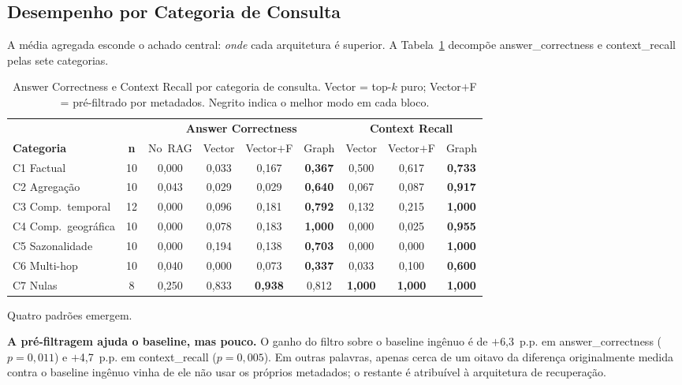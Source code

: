 \documentclass[conference]{IEEEtran}
\begin{document}
\subsection{Desempenho por Categoria de Consulta}

A média agregada esconde o achado central: \emph{onde} cada arquitetura
é superior. A Tabela~\ref{tab:por_categoria} decompõe answer\_correctness
e context\_recall pelas sete categorias.

\begin{table}[htbp]
\caption{Answer Correctness e Context Recall por categoria de consulta.
  Vector = top-$k$ puro; Vector$+$F = pré-filtrado por metadados.
  Negrito indica o melhor modo em cada bloco.}
\label{tab:por_categoria}
\begin{center}
\footnotesize
\begin{tabular}{lc|cccc|ccc}
\toprule
 & & \multicolumn{4}{c|}{\textbf{Answer Correctness}} &
     \multicolumn{3}{c}{\textbf{Context Recall}} \\
\cmidrule(lr){3-6}\cmidrule(lr){7-9}
\textbf{Categoria} & \textbf{n} & No~RAG & Vector & Vector$+$F & Graph &
  Vector & Vector$+$F & Graph \\
\midrule
C1 Factual & 10 & 0,000 & 0,033 & 0,167 & \textbf{0,367} & 0,500 & 0,617 & \textbf{0,733} \\
C2 Agregação & 10 & 0,043 & 0,029 & 0,029 & \textbf{0,640} & 0,067 & 0,087 & \textbf{0,917} \\
C3 Comp.\ temporal & 12 & 0,000 & 0,096 & 0,181 & \textbf{0,792} & 0,132 & 0,215 & \textbf{1,000} \\
C4 Comp.\ geográfica & 10 & 0,000 & 0,078 & 0,183 & \textbf{1,000} & 0,000 & 0,025 & \textbf{0,955} \\
C5 Sazonalidade & 10 & 0,000 & 0,194 & 0,138 & \textbf{0,703} & 0,000 & 0,000 & \textbf{1,000} \\
C6 Multi-hop & 10 & 0,040 & 0,000 & 0,073 & \textbf{0,337} & 0,033 & 0,100 & \textbf{0,600} \\
C7 Nulas & 8 & 0,250 & 0,833 & \textbf{0,938} & 0,812 & \textbf{1,000} & \textbf{1,000} & \textbf{1,000} \\
\bottomrule
\end{tabular}
\end{center}
\end{table}

Quatro padrões emergem.

\textbf{A pré-filtragem ajuda o baseline, mas pouco.} O ganho do filtro sobre o
baseline ingênuo é de $+$6,3~p.p. em answer\_correctness ($p=0{,}011$) e
$+$4,7~p.p. em context\_recall ($p=0{,}005$). Em outras palavras, apenas cerca
de um oitavo da diferença originalmente medida contra o baseline ingênuo vinha
de ele não usar os próprios metadados; o restante é atribuível à arquitetura de
recuperação.
\end{document}
